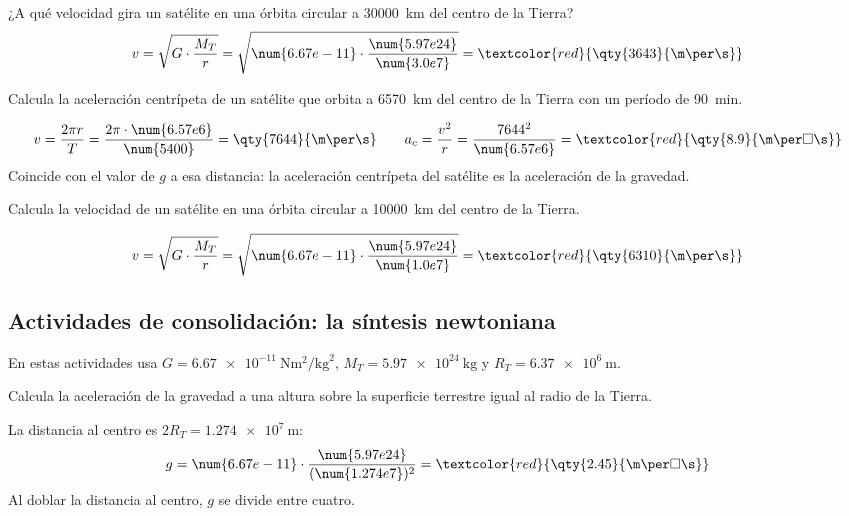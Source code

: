 \begin{example}
    ¿A qué velocidad gira un satélite en una órbita circular a \qty{30000}{\km} del centro de la Tierra?
    \[ v = \sqrt{G \cdot \frac{M_T}{r}} = \sqrt{\num{6.67e-11} \cdot \frac{\num{5.97e24}}{\num{3.0e7}}} = \textcolor{red}{\qty{3643}{\m\per\s}} \]
\end{example}

\begin{exercise}
    Calcula la aceleración centrípeta de un satélite que orbita a \qty{6570}{\km} del centro de la Tierra con un período de \qty{90}{\minute}.
    \begin{solu}
        \[ v = \frac{2\pi r}{T} = \frac{2\pi \cdot \num{6.57e6}}{\num{5400}} = \qty{7644}{\m\per\s} \qquad a_c = \frac{v^2}{r} = \frac{7644^2}{\num{6.57e6}} = \textcolor{red}{\qty{8.9}{\m\per\square\s}} \]
        Coincide con el valor de \(g\) a esa distancia: la aceleración centrípeta del satélite es la aceleración de la gravedad.
    \end{solu}
\end{exercise}

\begin{exercise}
    Calcula la velocidad de un satélite en una órbita circular a \qty{10000}{\km} del centro de la Tierra.
    \begin{solu}
        \[ v = \sqrt{G \cdot \frac{M_T}{r}} = \sqrt{\num{6.67e-11} \cdot \frac{\num{5.97e24}}{\num{1.0e7}}} = \textcolor{red}{\qty{6310}{\m\per\s}} \]
    \end{solu}
\end{exercise}

\subsection*{Actividades de consolidación: la síntesis newtoniana}

En estas actividades usa \(G = \qty{6.67e-11}{\newton\square\m\per\square\kg}\), \(M_T = \qty{5.97e24}{\kg}\) y \(R_T = \qty{6.37e6}{\m}\).

\begin{exercise}
    Calcula la aceleración de la gravedad a una altura sobre la superficie terrestre igual al radio de la Tierra.
    \begin{solu}
        La distancia al centro es \(2R_T = \qty{1.274e7}{\m}\):
        \[ g = \num{6.67e-11} \cdot \frac{\num{5.97e24}}{(\num{1.274e7})^2} = \textcolor{red}{\qty{2.45}{\m\per\square\s}} \]
        Al doblar la distancia al centro, \(g\) se divide entre cuatro.
    \end{solu}
\end{exercise}

